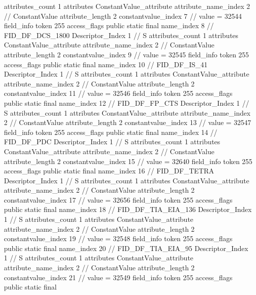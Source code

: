 {{{{{				attributes_count	1
				attributes {
				ConstantValue_attribute {
					attribute_name_index	2		// ConstantValue
					attribute_length	2
					constantvalue_index	7		// value = 32544
				}
				}
			}
			field_info {
				token	255
				access_flags	public static final
				name_index	8		// FID_DF_DCS_1800
				Descriptor_Index	1		// S
				attributes_count	1
				attributes {
				ConstantValue_attribute {
					attribute_name_index	2		// ConstantValue
					attribute_length	2
					constantvalue_index	9		// value = 32545
				}
				}
			}
			field_info {
				token	255
				access_flags	public static final
				name_index	10		// FID_DF_IS_41
				Descriptor_Index	1		// S
				attributes_count	1
				attributes {
				ConstantValue_attribute {
					attribute_name_index	2		// ConstantValue
					attribute_length	2
					constantvalue_index	11		// value = 32546
				}
				}
			}
			field_info {
				token	255
				access_flags	public static final
				name_index	12		// FID_DF_FP_CTS
				Descriptor_Index	1		// S
				attributes_count	1
				attributes {
				ConstantValue_attribute {
					attribute_name_index	2		// ConstantValue
					attribute_length	2
					constantvalue_index	13		// value = 32547
				}
				}
			}
			field_info {
				token	255
				access_flags	public static final
				name_index	14		// FID_DF_PDC
				Descriptor_Index	1		// S
				attributes_count	1
				attributes {
				ConstantValue_attribute {
					attribute_name_index	2		// ConstantValue
					attribute_length	2
					constantvalue_index	15		// value = 32640
				}
				}
			}
			field_info {
				token	255
				access_flags	public static final
				name_index	16		// FID_DF_TETRA
				Descriptor_Index	1		// S
				attributes_count	1
				attributes {
				ConstantValue_attribute {
					attribute_name_index	2		// ConstantValue
					attribute_length	2
					constantvalue_index	17		// value = 32656
				}
				}
			}
			field_info {
				token	255
				access_flags	public static final
				name_index	18		// FID_DF_TIA_EIA_136
				Descriptor_Index	1		// S
				attributes_count	1
				attributes {
				ConstantValue_attribute {
					attribute_name_index	2		// ConstantValue
					attribute_length	2
					constantvalue_index	19		// value = 32548
				}
				}
			}
			field_info {
				token	255
				access_flags	public static final
				name_index	20		// FID_DF_TIA_EIA_95
				Descriptor_Index	1		// S
				attributes_count	1
				attributes {
				ConstantValue_attribute {
					attribute_name_index	2		// ConstantValue
					attribute_length	2
					constantvalue_index	21		// value = 32549
				}
				}
			}
			field_info {
				token	255
				access_flags	public static final
}}}}}
